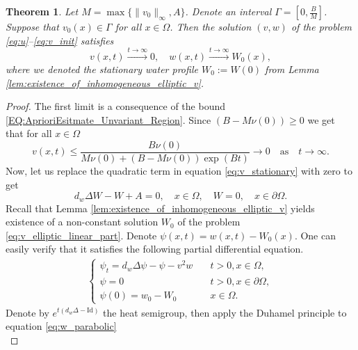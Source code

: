 \documentclass[preprint,12pt]{elsarticle}
\theoremstyle{plain}
\newtheorem{thm}{Theorem}[section]
\theoremstyle{definition}
\theoremstyle{remark}
\begin{document}
\begin{thm}
    \label{thm:Exinction-Of-Vegetation}
    Let $M = \max\{\|v_0\|_\infty, A\}$. Denote an interval $\Gamma  = \left[0, \frac{B}{M}\right]$. Suppose that $v_0(x) \in \Gamma$ for all $x \in \Omega$. Then the solution $(v, w)$ of the problem \eqref{eq:u}--\eqref{eq:v_init} satisfies
    \begin{equation}
        v(x,t) \xrightarrow{t \rightarrow \infty} 0, \quad w(x,t) \xrightarrow{t \rightarrow \infty} W_0(x),
    \end{equation}
    where we denoted the stationary water profile $W_0 := W(0)$ from Lemma \ref{lem:existence_of_inhomogeneous_elliptic_v}.
\end{thm}
\begin{proof}
    The first limit is a consequence of the bound \eqref{EQ:AprioriEsitmate_Unvariant_Region}. Since $(B - M\nu(0)) \geq 0$ we get that for all $x \in \Omega$
    \begin{equation*}
        v(x,t) \leq \frac{B\nu(0)}{M \nu(0) + 
        (B - M \nu(0)) \exp(B t)} \rightarrow 0 \quad \text{as} \quad t \rightarrow \infty.
    \end{equation*}
    Now, let us replace the quadratic term in equation \eqref{eq:v_stationary} with zero to get
    \begin{equation}
        \label{eq:v_elliptic_linear_part}
        d_w \Delta W - W + A = 0, \quad x \in \Omega, \quad W = 0, \quad x \in \partial \Omega.
    \end{equation}
    Recall that Lemma \ref{lem:existence_of_inhomogeneous_elliptic_v} yields existence of a non-constant solution $W_0$ of the problem \eqref{eq:v_elliptic_linear_part}. Denote $\psi(x,t) = w(x,t) - W_0(x)$. One can easily verify that it satisfies the following partial differential equation.
    \begin{align}
        \label{eq:w_parabolic}
        \begin{cases}
            \psi_t = d_w\Delta \psi - \psi - v^2w &\quad t > 0, x \in \Omega, \\
            \psi = 0 &\quad t > 0, x \in \partial\Omega, \\
            \psi(0) = w_0 - W_0 &\quad x \in \Omega.
        \end{cases}
    \end{align}
    Denote by $e^{t(d_w\Delta - \mathrm{Id})}$ the heat semigroup, then apply the Duhamel principle to equation \eqref{eq:w_parabolic}
    \begin{equation}
        \label{eq:w_duhmel_principle}

\end{equation}
\end{proof}
\end{document}
